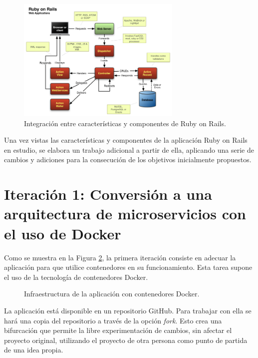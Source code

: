 \begin{figure}[H]
\centering
\includegraphics[width=0.7\textwidth]{images/figures/rubyonrails.png}
\caption{Integración entre características y componentes de Ruby on Rails.\footnotemark \label{fig:architecturesampleapp}}
\end{figure}


Una vez vistas las características y componentes de la aplicación Ruby on Rails en estudio, se elabora un trabajo adicional a partir de ella, aplicando una serie de cambios y adiciones para la consecución de los objetivos inicialmente propuestos.

\section[Iteración 1: Arquitectura de microservicios]{Iteración 1: Conversión a una arquitectura de microservicios con el uso de Docker}

Como se muestra en la Figura \ref{fig:figure_docker_microservices}, la primera iteración consiste en adecuar la aplicación para que utilice contenedores en su funcionamiento. Esta tarea supone el uso de la tecnología de contenedores Docker.

\begin{figure}[H]
\caption{Infraestructura de la aplicación con contenedores Docker.\label{fig:figure_docker_microservices}}
\end{figure}

La aplicación  está disponible en un repositorio GitHub. Para trabajar con ella se hará una copia del repositorio a través de la opción \textit{fork}. Esto crea una bifurcación que permite la libre experimentación de cambios, sin afectar el proyecto original, utilizando el proyecto de otra persona como punto de partida de una idea propia.


